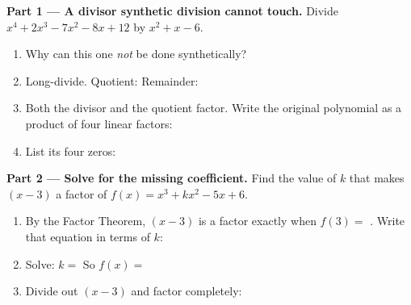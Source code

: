 \documentclass[10pt]{article}
\begin{document}
\begin{tcolorbox}[colback=white, colframe=black!40, title=\textbf{Tier E --- Extension},
    fonttitle=\bfseries, arc=1.5mm, left=3mm, right=3mm, top=2mm, bottom=2mm, breakable]
\textbf{Part 1 --- A divisor synthetic division cannot touch.} Divide
$x^4 + 2x^3 - 7x^2 - 8x + 12$ by $x^2 + x - 6$.
\begin{enumerate}[label=(\alph*), leftmargin=1.8em, itemsep=6pt]
  \item Why can this one \emph{not} be done synthetically? \blank{5.4cm}
  \item Long-divide. \quad Quotient: \blank{3.0cm} \quad Remainder: \blank{1.2cm}

    \vspace{1.6in}

  \item Both the divisor and the quotient factor. Write the original polynomial as a product of four
        linear factors: \blank{6.0cm}
  \item List its four zeros: \blank{4.6cm}
\end{enumerate}

\vspace{5pt}
\textbf{Part 2 --- Solve for the missing coefficient.} Find the value of $k$ that makes $(x-3)$ a
factor of $f(x) = x^3 + kx^2 - 5x + 6$.
\begin{enumerate}[label=(\alph*), leftmargin=1.8em, itemsep=6pt]
  \item By the Factor Theorem, $(x-3)$ is a factor exactly when $f(3) = $ \blank{1.0cm}. Write that
        equation in terms of $k$: \blank{4.6cm}
  \item Solve: $k = $ \blank{1.4cm} \; So $f(x) = $ \blank{4.4cm}
  \item Divide out $(x-3)$ and factor completely: \blank{5.4cm}
\end{enumerate}


\end{tcolorbox}
\end{document}
